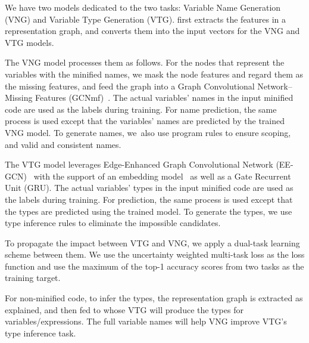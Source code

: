 We have two models dedicated to the two tasks: Variable Name
Generation (VNG) and Variable Type Generation (VTG). {\tool}
first extracts the features in a representation graph,
and converts them into the input vectors for the VNG and VTG models.

The VNG model processes them as follows. For the nodes that represent
the variables with the minified names, we mask the node features and
regard them as the missing features, and feed the graph into a Graph
Convolutional Network--Missing Features (GCNmf)~\cite{GCNmf}. The
actual variables' names in the input minified code are used as the
labels during training. For name prediction, the same process is used
except that the variables' names are predicted by the trained VNG
model. To generate names, we~also use program rules to ensure scoping,
and valid and consistent names.

The VTG model leverages Edge-Enhanced Graph Convolutional Network
(EE-GCN)~\cite{ee-gcn} with the support of an embedding
model~\cite{pennington2014glove} as well as a Gate Recurrent Unit
(GRU). The actual variables' types in the input minified code
are used as the labels during training. For prediction, the same
process is used except that the types are predicted
using the trained model. To generate the types, we use type
inference rules to eliminate the impossible candidates.


To propagate the impact between VTG and VNG, we apply a dual-task
learning scheme between them. We use the uncertainty weighted
multi-task loss as the loss function and use the
maximum of the top-1 accuracy scores from two tasks as the training
target.

For non-minified code, to infer the types, the representation graph is
extracted as explained, and then fed to {\tool} whose VTG will produce
the types for variables/expressions. The full variable names will help
VNG improve VTG's type inference task.




